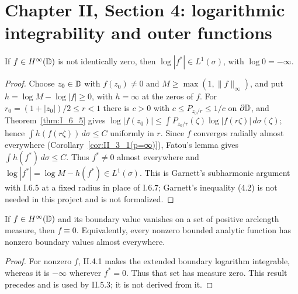\section{Chapter II, Section 4: logarithmic integrability and outer functions}

\begin{theorem}
  \label{thm:II_4_1}
  \leanok
  \mainline
  If $f\in H^\infty(\mathbb{D})$ is not identically zero, then
  $\log|f^*|\in L^1(\sigma)$, with $\log0=-\infty$.
  \begin{proof}
    \leanok
    Choose $z_0\in\mathbb{D}$ with $f(z_0)\ne0$ and $M\ge\max(1,\|f\|_\infty)$, and
    put $h=\log M-\log|f|\ge0$, with $h=\infty$ at the zeros of $f$. For
    $r_0=(1+|z_0|)/2\le r<1$ there is $c>0$ with $c\le P_{z_0/r}\le1/c$ on
    $\partial\mathbb{D}$, and Theorem~\ref{thm:I_6_5} gives
    $\log|f(z_0)|\le\int P_{z_0/r}(\zeta)\log|f(r\zeta)|\,d\sigma(\zeta)$;
    hence $\int h(f(r\zeta))\,d\sigma\le C$ uniformly in $r$. Since $f$
    converges radially almost everywhere (Corollary~\ref{cor:II_3_1(p=∞)}),
    Fatou's lemma gives $\int h(f^*)\,d\sigma\le C$. Thus $f^*\ne0$ almost
    everywhere and $\log|f^*|=\log M-h(f^*)\in L^1(\sigma)$.
    This is Garnett's subharmonic argument with I.6.5 at a fixed radius in
    place of I.6.7; Garnett's inequality (4.2) is not needed in this project
    and is not formalized.
  \end{proof}
\end{theorem}

\begin{corollary}
  \label{cor:II_4_2}
  \leanok
  \mainline
  If $f\in H^\infty(\mathbb{D})$ and its boundary value vanishes on a set of
  positive arclength measure, then $f\equiv0$. Equivalently, every nonzero
  bounded analytic function has nonzero boundary values almost everywhere.
  \begin{proof}
    \leanok
    For nonzero $f$, II.4.1 makes the extended boundary logarithm integrable,
    whereas it is $-\infty$ wherever $f^*=0$. Thus that set has measure zero.
    This result precedes and is used by II.5.3; it is not derived from it.
  \end{proof}
\end{corollary}

